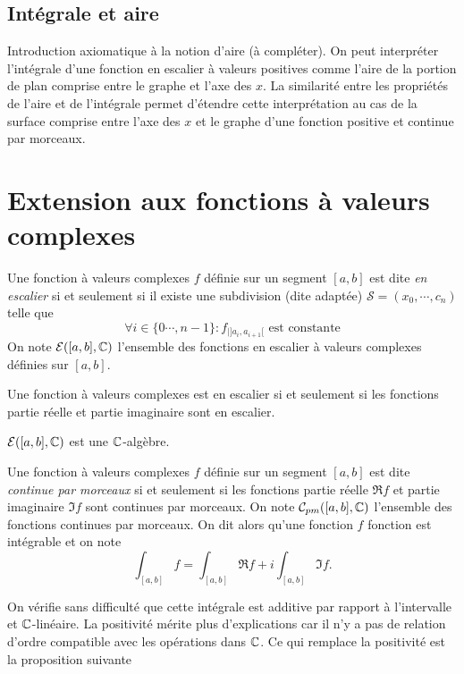 \subsection{Intégrale et aire}
Introduction axiomatique à la notion d'aire (à compléter). On peut interpréter l'intégrale d'une fonction en escalier à valeurs positives comme l'aire de la portion de plan comprise entre le graphe et l'axe des $x$. La similarité entre les propriétés de l'aire et de l'intégrale permet d'étendre cette interprétation au cas de la surface comprise entre l'axe des $x$ et le graphe d'une fonction positive et continue par morceaux.

\section{Extension aux fonctions à valeurs complexes}
\begin{defi}
Une fonction à valeurs complexes $f$ définie sur un segment $[a,b]$ est dite \emph{en escalier} si et seulement si il existe une subdivision (dite adaptée) $\mathcal S= (x_0,\cdots,c_n)$ telle que
\begin{displaymath}
 \forall i\in\{0\cdots,n-1\}: f_{|]a_i,a_{i+1}[} \text{ est constante}
\end{displaymath}
On note $\mathcal E([a,b],\mathbb{C})$ l'ensemble des fonctions en escalier à valeurs complexes définies sur $[a,b]$.
\end{defi}
\begin{propn}
 Une fonction à valeurs complexes est en escalier si et seulement si les fonctions partie réelle et partie imaginaire sont en escalier.
\end{propn}
\begin{propn}
$\mathcal E([a,b],\mathbb{C})$ est une $\mathbb{C}$-algèbre.
\end{propn}
\begin{defi}
 Une fonction à valeurs complexes $f$ définie sur un segment $[a,b]$ est dite \emph{continue par morceaux} si et seulement si les fonctions partie réelle $\Re f$ et partie imaginaire $\Im f$ sont continues par morceaux. On note $\mathcal C_{pm}([a,b],\mathbb{C})$ l'ensemble des fonctions continues par morceaux. On dit alors qu'une fonction $f$ fonction est intégrable et on note
\begin{displaymath}
 \int_{[a,b]}f =  \int_{[a,b]}\Re f + i \int_{[a,b]}\Im f .
\end{displaymath}
\end{defi}
On vérifie sans difficulté que cette intégrale est additive par rapport à l'intervalle et $\mathbb{C}$-linéaire. La positivité mérite plus d'explications car il n'y a pas de relation d'ordre compatible avec les opérations dans $\mathbb{C}$. Ce qui remplace la positivité est la proposition suivante
